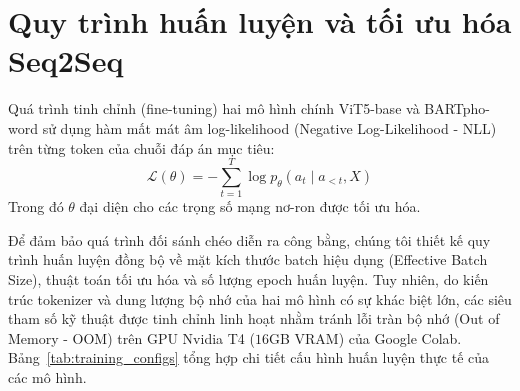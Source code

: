 \section{Quy trình huấn luyện và tối ưu hóa Seq2Seq}
Quá trình tinh chỉnh (fine-tuning) hai mô hình chính ViT5-base \cite{phan2022vit5} và BARTpho-word \cite{tran2021bartpho} sử dụng hàm mất mát âm log-likelihood (Negative Log-Likelihood - NLL) trên từng token của chuỗi đáp án mục tiêu:
\begin{equation}
  \mathcal{L}(\theta) = -\sum_{t=1}^{T}\log p_\theta(a_t \mid a_{<t}, X)
\end{equation}
Trong đó $\theta$ đại diện cho các trọng số mạng nơ-ron được tối ưu hóa.

Để đảm bảo quá trình đối sánh chéo diễn ra công bằng, chúng tôi thiết kế quy trình huấn luyện đồng bộ về mặt kích thước batch hiệu dụng (Effective Batch Size), thuật toán tối ưu hóa và số lượng epoch huấn luyện. Tuy nhiên, do kiến trúc tokenizer và dung lượng bộ nhớ của hai mô hình có sự khác biệt lớn, các siêu tham số kỹ thuật được tinh chỉnh linh hoạt nhằm tránh lỗi tràn bộ nhớ (Out of Memory - OOM) trên GPU Nvidia T4 ($16$GB VRAM) của Google Colab. Bảng~\ref{tab:training_configs} tổng hợp chi tiết cấu hình huấn luyện thực tế của các mô hình.

\begin{table}[H]
\centering
\caption{Cấu hình siêu tham số huấn luyện thực tế trong đề tài}
\label{tab:training_configs}
\end{table}

